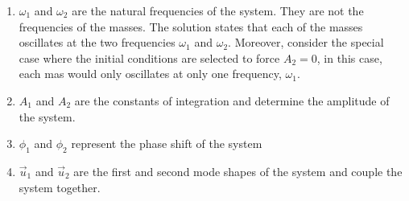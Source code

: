 \documentclass[12pt,letter]{article}
\numberwithin{ex}{section} %
\numberwithin{re}{section} %
\begin{document}
\begin{enumerate}
\item $\omega_1$ and $\omega_2$ are the natural frequencies of the system. They are not the frequencies of the masses. The solution states that each of the masses oscillates at the two frequencies $\omega_1$ and $\omega_2$. Moreover, consider the special case where the initial conditions are selected to force $A_2 = 0$, in this case, each mas would only oscillates at only one frequency, $\omega_1$.
\item $A_1$ and $A_2$ are the constants of integration and determine the amplitude of the system.
\item $\phi_1$ and $\phi_2$ represent the phase shift of the system
\item $\vec{u}_1$ and $\vec{u}_2$ are the first and second mode shapes of the system and couple the system together.
\end{enumerate}
\end{document}
